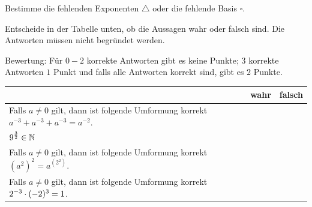 \documentclass[11pt]{exam}
\begin{document}
\begin{questions}


\question[4] %
Bestimme die fehlenden Exponenten $\triangle$ oder die fehlende Basis $\square$.


\question[2]
Entscheide in der Tabelle unten, ob die Aussagen wahr oder falsch sind. Die Antworten müssen nicht begründet werden.\newline
\begin{small}
	Bewertung: Für $0-2$ korrekte Antworten gibt es keine Punkte; $3$ korrekte Antworten $1$ Punkt und falls alle Antworten korrekt sind, gibt es $2$ Punkte.
\end{small}
\begingroup
\renewcommand{\arraystretch}{1.5}
\begin{table}[H]
	\centering
	\begin{tabular}{|p{12cm}|c|c|}\hline
		& wahr & falsch \\\hline
		Falls $a\neq0$ gilt, dann ist folgende Umformung korrekt  $a^{-3}+a^{-3}+a^{-3}=a^{-2}$. & & \\\hline
		$\displaystyle 9^{\frac{3}{2}}\in\mathbb{N}$ & & \\\hline
		Falls $a\neq0$ gilt, dann ist folgende Umformung korrekt  $\displaystyle \left(a^2\right)^2=a^{\left(2^2\right)}$. & & \\\hline
		Falls $a\neq0$ gilt, dann ist folgende Umformung korrekt  $2^{-3}\cdot(-2)^3=1$. & & \\\hline
	\end{tabular}
\end{table}
\endgroup



\end{questions}
\end{document}
